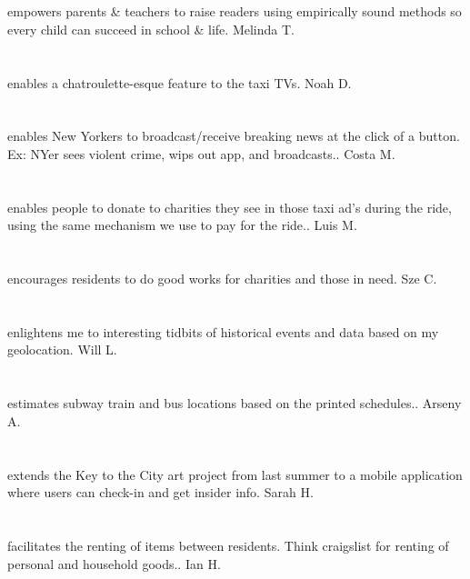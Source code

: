 \section{}empowers parents \& teachers to raise readers using empirically sound methods so every child can succeed in school  \& life. Melinda T.
\section{}enables a chatroulette-esque feature to the taxi TVs. Noah D.
\section{}enables New Yorkers to broadcast/receive  breaking news at the click of a button. Ex: NYer sees violent crime,  wips out app,  and broadcasts.. Costa M.
\section{}enables people to donate to charities they see in those taxi ad's during the ride,  using the same mechanism we use to pay for the ride.. Luis M.
\section{}encourages residents to do good works for charities and those in need. Sze C.
\section{}enlightens me to interesting tidbits of historical events and data based on my geolocation. Will L.
\section{}estimates subway train and bus locations based on the printed schedules.. Arseny A.
\section{}extends the Key to the City art project from last summer to a mobile application where users can check-in and get insider info. Sarah H.
\section{}facilitates the renting of items between residents. Think  craigslist for renting of personal and household goods.. Ian H.
